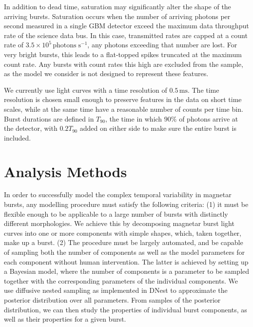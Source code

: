 \documentclass[12pt]{emulateapj}
\newcommand{\counts}{y}
\begin{document}
In addition to dead time, saturation may significantly alter the shape of the arriving bursts. Saturation occurs when the number of arriving photons per second
measured in a single GBM detector exceed the maximum data throughput rate of the science data bus. In this case, transmitted rates are capped at a 
count rate of $3.5 \times 10^{5} \, \mathrm{photons} \; \mathrm{s}^{-1}$, any photons exceeding that number are lost. For very bright bursts, this leads
to a flat-topped spikes truncated at the maximum count rate. Any bursts with count rates this high are excluded from the sample, as the model we
consider is not designed to represent these features. 

We currently use light curves with a time resolution of $0.5\,\mathrm{ms}$. The time resolution is chosen small enough to preserve features
in the data on short time scales, while at the same time have a reasonable number of counts per time bin. 
Burst durations are defined in $T_{90}$, the time in which $90\%$ of photons arrive at the detector, with $0.2T_{90}$ added on either side
to make sure the entire burst is included. 




\section{Analysis Methods}
\label{sec:methods}
In order to successfully model the complex temporal variability in magnetar bursts, any modelling procedure must satisfy the following criteria: (1) it must be flexible enough to be applicable to a large number of bursts with distinctly different morphologies. We achieve this by decomposing magnetar burst light curves into one or more components with simple shapes, which, taken together, make up a burst. (2) The procedure must be largely automated, and be capable of sampling both the number of components as well as the model parameters for each component without human intervention. The latter is achieved by setting up a Bayesian model, where the number of components is a parameter to be sampled together with the corresponding parameters of the individual components. We use diffusive nested sampling as implemented in DNest \citep{brewer2011} to approximate the posterior distribution over all parameters. From samples of the posterior distribution,
we can then study the properties of individual burst components, as well as their properties for a given burst.
\end{document}
